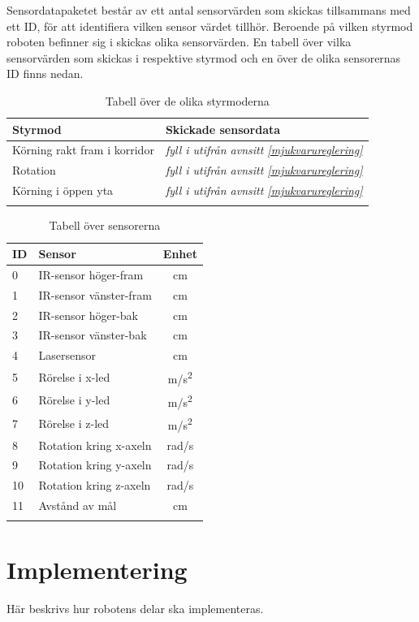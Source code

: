 \documentclass[11pt]{article}
\begin{document}
\begin{flushleft}
Sensordatapaketet består av ett antal sensorvärden som skickas tillsammans med ett ID, för att identifiera vilken sensor värdet tillhör. Beroende på vilken styrmod roboten befinner sig i skickas olika sensorvärden. En tabell över vilka sensorvärden som skickas i respektive styrmod och en över de olika sensorernas ID finns nedan.

\begin{longtable}[l]{| l | l |} \hline
\textbf{Styrmod} & \textbf{Skickade sensordata} \\ \hline 
Körning rakt fram i korridor & \textit{fyll i utifrån avnsitt \ref{mjukvarureglering}} \\ \hline
Rotation & \textit{fyll i utifrån avnsitt \ref{mjukvarureglering}} \\ \hline
Körning i öppen yta & \textit{fyll i utifrån avnsitt \ref{mjukvarureglering}} \\ \hline
\caption{Tabell över de olika styrmoderna}
\end{longtable}

\begin{longtable}[l]{| l | l | c |} \hline
\textbf{ID} & \textbf{Sensor} & \textbf{Enhet} \\ \hline 
0 & IR-sensor höger-fram & cm \\ \hline
1 & IR-sensor vänster-fram  & cm \\ \hline
2 & IR-sensor höger-bak  & cm  \\ \hline
3 & IR-sensor vänster-bak  &  cm \\ \hline
4 & Lasersensor & cm  \\ \hline
5 & Rörelse i x-led & m/s\textsuperscript{2} \\ \hline
6 & Rörelse i y-led & m/s\textsuperscript{2} \\ \hline
7 & Rörelse i z-led & m/s\textsuperscript{2} \\ \hline
8 & Rotation kring x-axeln & rad/s \\ \hline
9 & Rotation kring y-axeln & rad/s \\ \hline
10 & Rotation kring z-axeln & rad/s \\ \hline
11 & Avstånd av mål & cm \\ \hline
\caption{Tabell över sensorerna}
\end{longtable}


\pagebreak
\section{Implementering}
Här beskrivs hur robotens delar ska implementeras. 



\end{flushleft}
\end{document}
